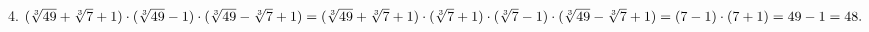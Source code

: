 4. $(\sqrt[3]{49}+\sqrt[3]{7}+1)\cdot(\sqrt[3]{49}-1)\cdot(\sqrt[3]{49}-\sqrt[3]{7}+1) = (\sqrt[3]{49}+\sqrt[3]{7}+1)\cdot(\sqrt[3]{7}+1)\cdot(\sqrt[3]{7}-1)\\\cdot(\sqrt[3]{49}-\sqrt[3]{7}+1) = (7 - 1)\cdot(7 + 1) = 49 - 1 = 48.$\\
